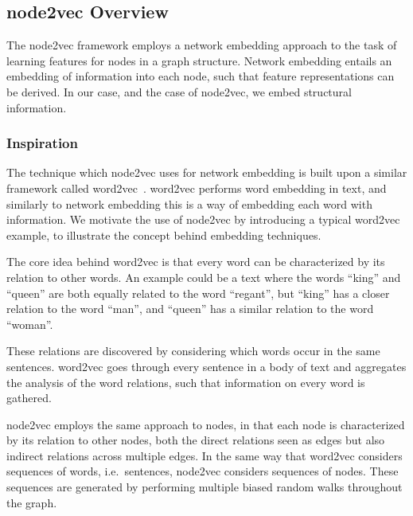 \subsection{node2vec Overview}\label{sec:node2vec}
The node2vec framework employs a network embedding approach to the task of learning features for nodes in a graph structure. Network embedding entails an embedding of information into each node, such that feature representations can be derived. In our case, and the case of node2vec, we embed structural information.

\subsubsection{Inspiration}
The technique which node2vec uses for network embedding is built upon a similar framework called word2vec~\cite{word2vec}. word2vec performs word embedding in text, and similarly to network embedding this is a way of embedding each word with information. We motivate the use of node2vec by introducing a typical word2vec example, to illustrate the concept behind embedding techniques.

The core idea behind word2vec is that every word can be characterized by its relation to other words. An example could be a text where the words \enquote{king} and \enquote{queen} are both equally related to the word \enquote{regant}, but \enquote{king} has a closer relation to the word \enquote{man}, and \enquote{queen} has a similar relation to the word \enquote{woman}.

These relations are discovered by considering which words occur in the same sentences. word2vec goes through every sentence in a body of text and aggregates the analysis of the word relations, such that information on every word is gathered.

node2vec employs the same approach to nodes, in that each node is characterized by its relation to other nodes, both the direct relations seen as edges but also indirect relations across multiple edges.
In the same way that word2vec considers sequences of words, i.e.\ sentences, node2vec considers sequences of nodes. These sequences are generated by performing multiple biased random walks throughout the graph.


